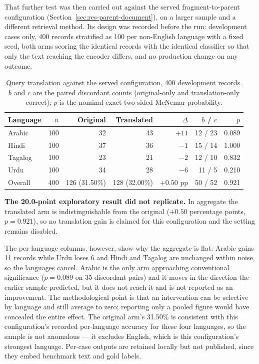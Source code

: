 That further test was then carried out against the served
fragment-to-parent configuration (Section~\ref{sec:res-parent-document}),
on a larger sample and a different retrieval method. Its design was
recorded before the run: development cases only, 400 records stratified as
100 per non-English language with a fixed seed, both arms scoring the
identical records with the identical classifier so that only the text
reaching the encoder differs, and no production change on any outcome.

\begin{table}[htbp]
\centering
\caption{Query translation against the served configuration, 400
development records. $b$ and $c$ are the paired discordant counts
(original-only and translation-only correct); $p$ is the nominal exact
two-sided McNemar probability.}
\label{tab:ch6-translation-served}
\small\renewcommand{\arraystretch}{1.3}
\begin{tabular}{lrrrrrr}
\toprule
\textbf{Language} & \textbf{$n$} & \textbf{Original} & \textbf{Translated}
& \textbf{$\Delta$} & \textbf{$b$ / $c$} & \textbf{$p$} \\
\midrule
Arabic  & 100 & 32 & 43 & $+11$ & 12 / 23 & 0.089 \\
Hindi   & 100 & 37 & 36 & $-1$  & 15 / 14 & 1.000 \\
Tagalog & 100 & 23 & 21 & $-2$  & 12 / 10 & 0.832 \\
Urdu    & 100 & 34 & 28 & $-6$  & 11 / 5  & 0.210 \\
\midrule
Overall & 400 & 126 (31.50\%) & 128 (32.00\%) & $+0.50$ pp & 50 / 52 & 0.921 \\
\bottomrule
\end{tabular}
\end{table}

\textbf{The 20.0-point exploratory result did not replicate.} In aggregate
the translated arm is indistinguishable from the original
($+0.50$ percentage points, $p=0.921$), so no translation gain is claimed
for this configuration and the setting remains disabled.

The per-language columns, however, show why the aggregate is flat: Arabic
gains 11 records while Urdu loses 6 and Hindi and Tagalog are unchanged
within noise, so the languages cancel. Arabic is the only arm approaching
conventional significance ($p=0.089$ on 35 discordant pairs) and it moves
in the direction the earlier sample predicted, but it does not reach it and
is not reported as an improvement. The methodological point is that an
intervention can be selective by language and still average to zero;
reporting only a pooled figure would have concealed the entire effect.
The original arm's 31.50\% is consistent with this configuration's recorded
per-language accuracy for these four languages, so the sample is not
anomalous --- it excludes English, which is this configuration's strongest
language. Per-case outputs are retained locally but not published, since
they embed benchmark text and gold labels.

